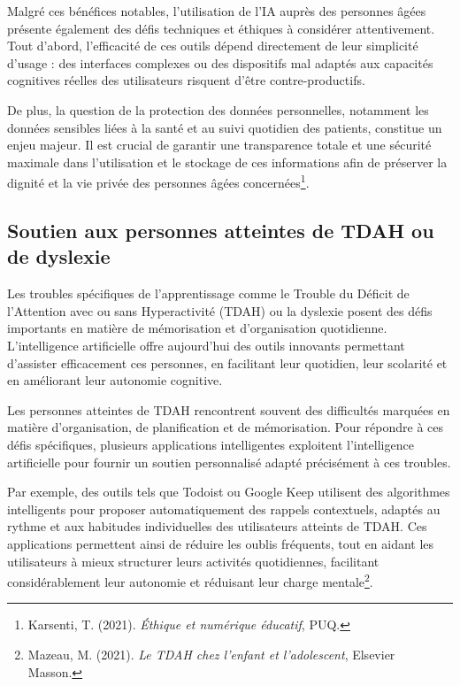 \documentclass[11pt,a4paper]{report}
\begin{document}
Malgré ces bénéfices notables, l’utilisation de l’IA auprès des personnes âgées présente également des défis techniques et éthiques à considérer attentivement. Tout d’abord, l’efficacité de ces outils dépend directement de leur simplicité d’usage : des interfaces complexes ou des dispositifs mal adaptés aux capacités cognitives réelles des utilisateurs risquent d’être contre-productifs.

De plus, la question de la protection des données personnelles, notamment les données sensibles liées à la santé et au suivi quotidien des patients, constitue un enjeu majeur. Il est crucial de garantir une transparence totale et une sécurité maximale dans l’utilisation et le stockage de ces informations afin de préserver la dignité et la vie privée des personnes âgées concernées\footnote{Karsenti, T. (2021). \textit{Éthique et numérique éducatif}, PUQ.}.

\subsection{Soutien aux personnes atteintes de TDAH ou de dyslexie}

Les troubles spécifiques de l’apprentissage comme le Trouble du Déficit de l’Attention avec ou sans Hyperactivité (TDAH) ou la dyslexie posent des défis importants en matière de mémorisation et d’organisation quotidienne. L’intelligence artificielle offre aujourd’hui des outils innovants permettant d’assister efficacement ces personnes, en facilitant leur quotidien, leur scolarité et en améliorant leur autonomie cognitive.

Les personnes atteintes de TDAH rencontrent souvent des difficultés marquées en matière d’organisation, de planification et de mémorisation. Pour répondre à ces défis spécifiques, plusieurs applications intelligentes exploitent l’intelligence artificielle pour fournir un soutien personnalisé adapté précisément à ces troubles.

Par exemple, des outils tels que Todoist ou Google Keep utilisent des algorithmes intelligents pour proposer automatiquement des rappels contextuels, adaptés au rythme et aux habitudes individuelles des utilisateurs atteints de TDAH. Ces applications permettent ainsi de réduire les oublis fréquents, tout en aidant les utilisateurs à mieux structurer leurs activités quotidiennes, facilitant considérablement leur autonomie et réduisant leur charge mentale\footnote{Mazeau, M. (2021). \textit{Le TDAH chez l'enfant et l'adolescent}, Elsevier Masson.}.
\end{document}

